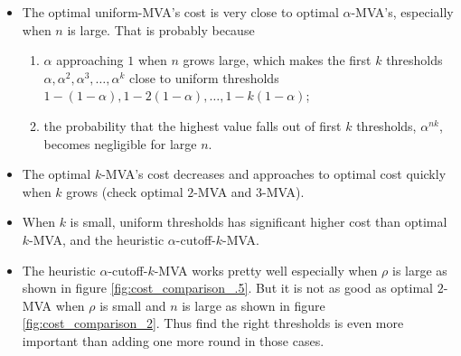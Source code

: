 \begin{itemize}
\item The optimal uniform-MVA's cost is very close to optimal $\alpha$-MVA's,
especially when $n$ is large. That is probably because
    \begin{enumerate}
        \item $\alpha$ approaching $1$ when $n$ grows large, which makes the
        first $k$ thresholds $\alpha, \alpha^2, \alpha^3, \ldots, \alpha^k$
        close to uniform thresholds $1-(1-\alpha), 1-2(1-\alpha), \ldots,
        1-k(1-\alpha)$; 

        \item the probability that the highest value falls out of first $k$
        thresholds, $\alpha^{nk}$, becomes negligible for large $n$.
    \end{enumerate}

\item The optimal $k$-MVA's cost decreases and approaches to optimal cost quickly
when $k$ grows (check optimal $2$-MVA and $3$-MVA).

\item When $k$ is small, uniform thresholds has significant higher cost than optimal
$k$-MVA, and the heuristic $\alpha$-cutoff-$k$-MVA.

\item The heuristic $\alpha$-cutoff-$k$-MVA works pretty well especially when
$\rho$ is large as shown in figure \ref{fig:cost_comparison_.5}. But it is not
as good as optimal $2$-MVA when $\rho$ is small and $n$ is large as shown in
figure \ref{fig:cost_comparison_2}. Thus find the right thresholds is even more
important than adding one more round in those cases.

\end{itemize}
